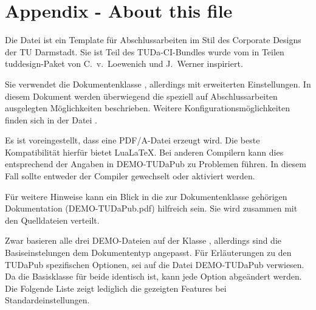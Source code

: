 \chapter{Appendix - About this file}


Die Datei  ist ein Template für Abschlussarbeiten im Stil des Corporate Designs der TU Darmstadt.
Sie ist Teil des TUDa-CI-Bundles wurde vom in Teilen tuddesign-Paket von C.~v.~Loewenich und J.~Werner inspiriert.

Sie verwendet die Dokumentenklasse , allerdings mit erweiterten Einstellungen. In diesem Dokument werden überwiegend die speziell auf Abschlussarbeiten ausgelegten Möglichkeiten beschrieben. Weitere Konfigurationsmöglichkeiten finden sich in der Datei  \cite{tudapub}.

Es ist voreingestellt, dass eine PDF/A-Datei erzeugt wird. Die beste Kompatibilität hierfür bietet Lua\LaTeX. Bei anderen Compilern kann dies entsprechend der Angaben in DEMO-TUDaPub zu Problemen führen. In diesem Fall sollte entweder der Compiler gewechselt oder  aktiviert werden.

Für weitere Hinweise kann ein Blick in die zur Dokumentenklasse gehörigen Dokumentation (DEMO-TUDaPub.pdf) hilfreich sein. Sie wird zusammen mit den Quelldateien verteilt.

Zwar basieren alle drei DEMO-Dateien auf der Klasse , allerdings sind die Basiseinstelungen dem Dokumententyp angepasst.
Für Erläuterungen zu den TUDaPub spezifischen Optionen, sei auf die Datei DEMO-TUDaPub verwiesen.
Da die Basisklasse für beide identisch ist, kann jede Option abgeändert werden. Die Folgende Liste zeigt lediglich die gezeigten Features bei Standardeinstellungen.


